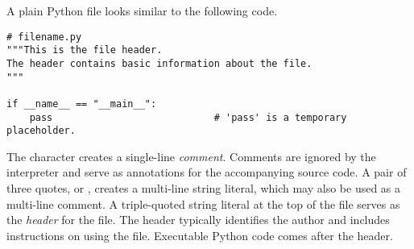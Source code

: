 A plain Python file looks similar to the following code.

\begin{lstlisting}
# filename.py
"""This is the file header.
The header contains basic information about the file.
"""

if __name__ == "__main__":
    pass                            # 'pass' is a temporary placeholder.
\end{lstlisting}

The \li{#} character creates a single-line \emph{comment}.
Comments are ignored by the interpreter and serve as annotations for the accompanying source code.
A pair of three quotes,  or , creates a multi-line string literal, which may also be used as a multi-line comment.
A triple-quoted string literal at the top of the file serves as the \emph{header} for the file.
The header typically identifies the author and includes instructions on using the file.
Executable Python code comes after the header.

